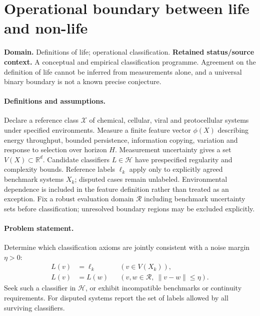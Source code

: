 \documentclass[11pt]{article}
\begin{document}
\section*{Operational boundary between life and non-life}
\label{prob:303}
\label{rank:330}
\par\smallskip

\noindent\textbf{Domain.} Definitions of life; operational classification. \quad \textbf{Retained status/source context.} A conceptual and empirical classification programme. Agreement on the definition of life cannot be inferred from measurements alone, and a universal binary boundary is not a known precise conjecture.

\paragraph{Definitions and assumptions.} Declare a reference class $\mathcal X$ of chemical, cellular, viral and protocellular systems under specified environments. Measure a finite feature vector $\phi(X)$ describing energy throughput, bounded persistence, information copying, variation and response to selection over horizon $H$. Measurement uncertainty gives a set $V(X)\subset\mathbb{R}^d$. Candidate classifiers $L\in\mathcal H$ have prespecified regularity and complexity bounds. Reference labels $\ell_k$ apply only to explicitly agreed benchmark systems $X_k$; disputed cases remain unlabeled. Environmental dependence is included in the feature definition rather than treated as an exception. Fix a robust evaluation domain $\mathcal R$ including benchmark uncertainty sets before classification; unresolved boundary regions may be excluded explicitly.

\paragraph{Problem statement.} Determine which classification axioms are jointly consistent with a noise margin $\eta>0$:
    \[\begin{aligned}
       L(v)&=\ell_k &&(v\in V(X_k)),\\
       L(v)&=L(w) &&(v,w\in\mathcal R,\ \|v-w\|\leq\eta).
    \end{aligned}\]
    Seek such a classifier in $\mathcal H$, or exhibit incompatible benchmarks or continuity requirements. For disputed systems report the set of labels allowed by all surviving classifiers.
\end{document}
